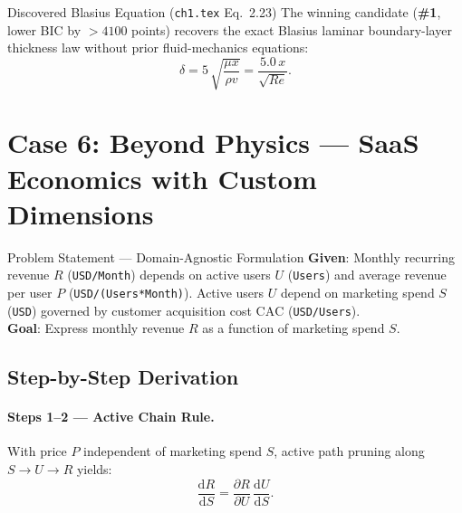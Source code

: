 \documentclass[11pt,a4paper]{article}
\newcommand{\dd}{\mathrm{d}}
\newcommand{\pd}[2]{\frac{\partial #1}{\partial #2}}
\newcommand{\td}[2]{\frac{\dd #1}{\dd #2}}
\begin{document}
\begin{resultbox}{Discovered Blasius Equation (\texttt{ch1.tex} Eq.~2.23)}
The winning candidate (\textbf{\#1}, lower BIC by $>4100$ points) recovers the exact Blasius laminar boundary-layer thickness law without prior fluid-mechanics equations:
\[
  \delta = 5\,\sqrt{\frac{\mu x}{\rho v}} = \frac{5.0\,x}{\sqrt{Re}}.
\]
\end{resultbox}

\section{Case 6: Beyond Physics — SaaS Economics with Custom Dimensions}

\begin{setupbox}{Problem Statement — Domain-Agnostic Formulation}
\textbf{Given}: Monthly recurring revenue $R$ (\texttt{USD/Month}) depends on active users $U$ (\texttt{Users}) and average revenue per user $P$ (\texttt{USD/(Users*Month)}). Active users $U$ depend on marketing spend $S$ (\texttt{USD}) governed by customer acquisition cost $\text{CAC}$ (\texttt{USD/Users}).\\
\textbf{Goal}: Express monthly revenue $R$ as a function of marketing spend $S$.
\end{setupbox}

\begin{center}
\end{center}

\subsection*{Step-by-Step Derivation}

\paragraph{Steps 1--2 — Active Chain Rule.}
With price $P$ independent of marketing spend $S$, active path pruning along $S \to U \to R$ yields:
\begin{equation}
  \td{R}{S} = \pd{R}{U}\,\td{U}{S}.
\end{equation}
\end{document}
